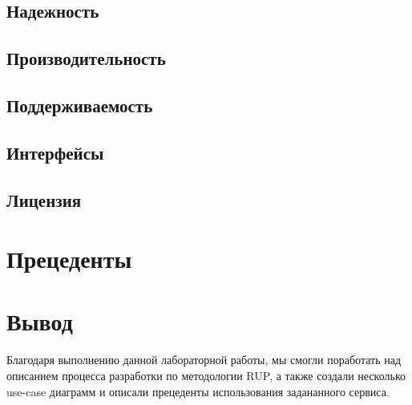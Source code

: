\documentclass{article}
\begin{document}
\subsection{Надежность}


\subsection{Производительность}


\subsection{Поддерживаемость}


\subsection{Интерфейсы}


\subsection{Лицензия}


\section{Прецеденты}


\section{Вывод}
Благодаря выполнению данной лабораторной работы,
мы смогли поработать над описанием процесса разработки
по методологии RUP, а также создали несколько use-case
диаграмм и описали прецеденты использования задананного
сервиса.
\end{document}
